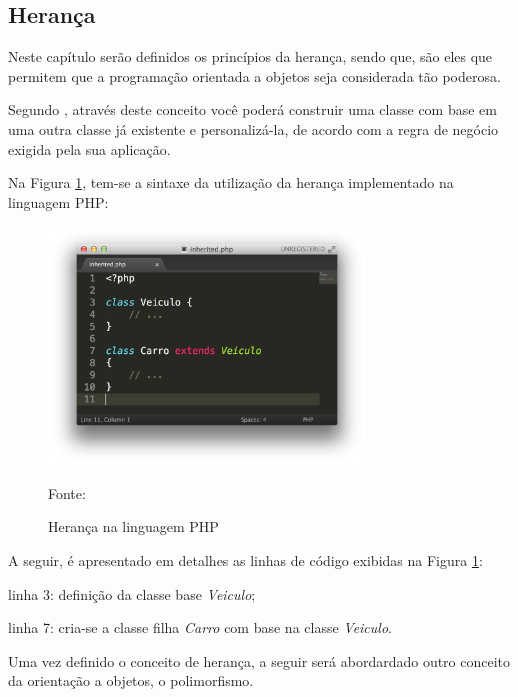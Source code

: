 \subsection{Herança}

Neste capítulo serão definidos os princípios da herança, sendo que, são eles que
permitem que a programação orientada a objetos seja considerada tão poderosa.

Segundo , através deste conceito você poderá
construir uma classe com base em uma outra classe já existente e personalizá-la,
de acordo com a regra de negócio exigida pela sua aplicação.

Na Figura \ref{fig:heranca}, tem-se a sintaxe da utilização da herança
implementado na linguagem \acs{PHP}:

\begin{figure}[h!tb]
	\caption{Herança na linguagem PHP}
	\label{fig:heranca}

	\centering
	\includegraphics[width=0.75\textwidth]{images/inherited.png}

	\centering
	\footnotesize Fonte: \fonteOAutor
\end{figure}

\FloatBarrier 	%

A seguir, é apresentado em detalhes as linhas de código exibidas na Figura
\ref{fig:heranca}:

\begin{alineas}
    \item linha 3: definição da classe base \textit{Veiculo};
    \item linha 7: cria-se a classe filha \textit{Carro} com base na classe
    \textit{Veiculo}.
\end{alineas}

Uma vez definido o conceito de herança, a seguir será abordardado outro conceito
da orientação a objetos, o polimorfismo.
